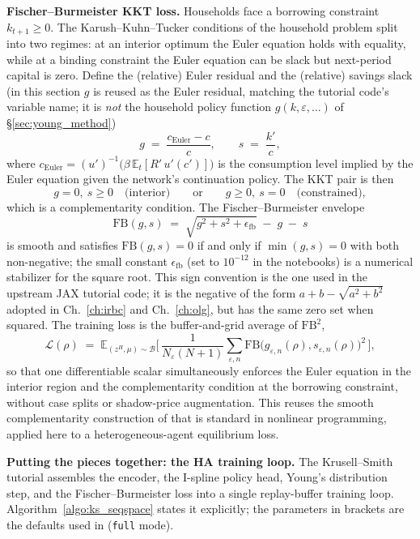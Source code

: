 \documentclass[11pt,a4paper]{report}
\begin{document}
\medskip\noindent\textbf{Fischer--Burmeister KKT loss.}
Households face a borrowing constraint $k_{t+1} \ge 0$.  The Karush--Kuhn--Tucker conditions of the household problem split into two regimes: at an interior optimum the Euler equation holds with equality, while at a binding constraint the Euler equation can be slack but next-period capital is zero.  Define the (relative) Euler residual and the (relative) savings slack (in this section $g$ is reused as the Euler residual, matching the tutorial code's variable name; it is \emph{not} the household policy function $g(k,\varepsilon,\ldots)$ of \S\ref{sec:young_method})
\[
g \;=\; \frac{c_{\text{Euler}} - c}{c}, \qquad s \;=\; \frac{k'}{c},
\]
where $c_{\text{Euler}} = (u')^{-1}\!\bigl(\beta\,\mathbb{E}_t [R'\,u'(c')]\bigr)$ is the consumption level implied by the Euler equation given the network's continuation policy.  The KKT pair is then
\[
g = 0,\ s \ge 0 \quad\text{(interior)} \qquad\text{or}\qquad g \ge 0,\ s = 0 \quad\text{(constrained)},
\]
which is a complementarity condition.  The Fischer--Burmeister envelope
\begin{equation}
\mathrm{FB}(g, s) \;=\; \sqrt{g^2 + s^2 + \epsilon_{\text{fb}}} \;-\; g \;-\; s
\label{eq:fb}
\end{equation}
is smooth and satisfies $\mathrm{FB}(g,s) = 0$ if and only if $\min(g, s) = 0$ with both non-negative; the small constant $\epsilon_{\text{fb}}$ (set to $10^{-12}$ in the notebooks) is a numerical stabilizer for the square root.  This sign convention is the one used in the upstream JAX tutorial code; it is the negative of the form $a+b-\sqrt{a^2+b^2}$ adopted in Ch.~\ref{ch:irbc} and Ch.~\ref{ch:olg}, but has the same zero set when squared.  The training loss is the buffer-and-grid average of $\mathrm{FB}^2$,
\[
\mathcal{L}(\rho) \;=\; \mathbb{E}_{(z^H,\mu)\sim\mathcal{B}}\biggl[\, \frac{1}{N_\varepsilon (N+1)} \sum_{\varepsilon,n} \mathrm{FB}\!\bigl(g_{\varepsilon,n}(\rho), s_{\varepsilon,n}(\rho)\bigr)^2 \,\biggr],
\]
so that one differentiable scalar simultaneously enforces the Euler equation in the interior region and the complementarity condition at the borrowing constraint, without case splits or shadow-price augmentation.  This reuses the smooth complementarity construction of \citet{fischer1992special} that is standard in nonlinear programming, applied here to a heterogeneous-agent equilibrium loss.

\medskip\noindent\textbf{Putting the pieces together: the HA training loop.}
The Krusell--Smith tutorial assembles the encoder, the I-spline policy head, Young's distribution step, and the Fischer--Burmeister loss into a single replay-buffer training loop.  Algorithm~\ref{algo:ks_seqspace} states it explicitly; the parameters in brackets are the defaults used in  (\texttt{full} mode).
\end{document}
